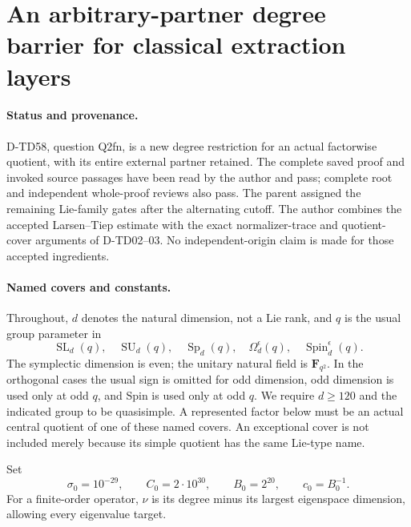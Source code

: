 \section{An arbitrary-partner degree barrier for classical extraction layers}
\label{sec:classical-factor-degree-barrier}

\paragraph{Status and provenance.}
D-TD58, question Q2fn, is a new degree restriction for an
actual factorwise quotient, with its entire external partner retained.
The complete saved proof and invoked source passages have been read
by the author and pass; complete root and independent whole-proof reviews also pass.
The parent assigned
the remaining Lie-family gates after the alternating cutoff. The
author combines the accepted Larsen--Tiep estimate with the exact
normalizer-trace and quotient-cover arguments of D-TD02--03.
No independent-origin claim is made for those accepted ingredients.

\paragraph{Named covers and constants.}
Throughout, $d$ denotes the natural dimension, not a Lie rank, and
$q$ is the usual group parameter in
\[
 \operatorname{SL}_d(q),\quad \operatorname{SU}_d(q),\quad
 \operatorname{Sp}_d(q),\quad \Omega_d^\epsilon(q),\quad
 \operatorname{Spin}_d^\epsilon(q).
 \tag{CFD.1}
\]
The symplectic dimension is even; the unitary natural field is
$\mathbf F_{q^2}$. In the orthogonal cases the usual sign is omitted
for odd dimension, odd dimension is used only at odd $q$, and Spin
is used only at odd $q$. We require $d\ge120$ and the indicated
group to be quasisimple. A represented factor below must be an
actual central quotient of one of these named covers. An exceptional
cover is not included merely because its simple quotient has the
same Lie-type name.

Set
\[
 \sigma_0=10^{-29},\qquad C_0=2\cdot10^{30},\qquad
 B_0=2^{20},\qquad c_0=B_0^{-1}.
 \tag{CFD.2}
\]
For a finite-order operator, $\nu$ is its degree minus its largest
eigenspace dimension, allowing every eigenvalue target.

